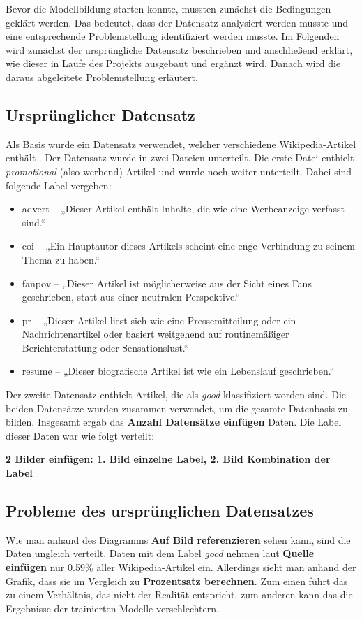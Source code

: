 
Bevor die Modellbildung starten konnte, mussten zunächst die Bedingungen geklärt werden. Das bedeutet, dass der Datensatz analysiert werden musste und eine entsprechende Problemstellung identifiziert werden musste. Im Folgenden wird zunächst der ursprüngliche Datensatz beschrieben und anschließend erklärt, wie dieser in Laufe des Projekts ausgebaut und ergänzt wird. Danach wird die daraus abgeleitete Problemstellung erläutert.

\subsection{Ursprünglicher Datensatz}
Als Basis wurde ein Datensatz verwendet, welcher  verschiedene Wikipedia-Artikel enthält \cite{UrsprungDatensatz}. Der Datensatz wurde in zwei Dateien unterteilt. Die erste Datei enthielt \emph{promotional} (also werbend) Artikel und wurde noch weiter unterteilt. Dabei sind folgende Label vergeben:
\begin{itemize}
    \item advert – „Dieser Artikel enthält Inhalte, die wie eine Werbeanzeige verfasst sind.“
\item coi – „Ein Hauptautor dieses Artikels scheint eine enge Verbindung zu seinem Thema zu haben.“
\item fanpov – „Dieser Artikel ist möglicherweise aus der Sicht eines Fans geschrieben, statt aus einer neutralen Perspektive.“
\item pr – „Dieser Artikel liest sich wie eine Pressemitteilung oder ein Nachrichtenartikel oder basiert weitgehend auf routinemäßiger Berichterstattung oder Sensationslust.“
\item resume – „Dieser biografische Artikel ist wie ein Lebenslauf geschrieben.“
\end{itemize}
Der zweite Datensatz enthielt Artikel, die als \emph{good} klassifiziert worden sind. Die beiden Datensätze wurden zusammen verwendet, um die gesamte Datenbasis zu bilden. Insgesamt ergab das \textbf{Anzahl Datensätze einfügen} Daten. Die Label dieser Daten war wie folgt verteilt:


\textbf{2 Bilder einfügen: 1. Bild einzelne Label, 2. Bild Kombination der Label}
\\



\subsection{Probleme des ursprünglichen Datensatzes}
Wie man anhand des Diagramms \textbf{Auf Bild referenzieren} sehen kann, sind die Daten ungleich verteilt. Daten mit dem Label \textit{good} nehmen laut \textbf{Quelle einfügen} nur 0.59\% aller Wikipedia-Artikel ein. Allerdings sieht man anhand der Grafik, dass sie im Vergleich zu \textbf{Prozentsatz berechnen}. Zum einen führt das zu einem Verhältnis, das nicht der Realität entspricht, zum anderen kann das die Ergebnisse der trainierten Modelle verschlechtern.



